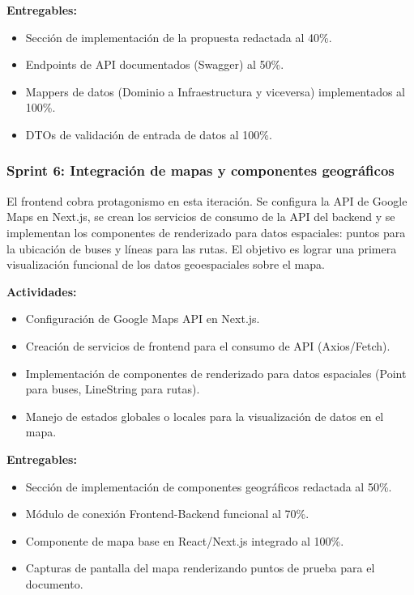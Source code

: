 \textbf{Entregables:}
\begin{itemize}
    \item Sección de implementación de la propuesta redactada al 40\%.
    \item Endpoints de API documentados (Swagger) al 50\%.
    \item Mappers de datos (Dominio a Infraestructura y viceversa) implementados al 100\%.
    \item DTOs de validación de entrada de datos al 100\%.
\end{itemize}

\subsubsection{Sprint 6: Integración de mapas y componentes geográficos}

El frontend cobra protagonismo en esta iteración. Se configura la API de Google Maps en Next.js, se crean los servicios de consumo de la API del backend y se implementan los componentes de renderizado para datos espaciales: puntos para la ubicación de buses y líneas para las rutas. El objetivo es lograr una primera visualización funcional de los datos geoespaciales sobre el mapa.

\textbf{Actividades:}
\begin{itemize}
    \item Configuración de Google Maps API en Next.js.
    \item Creación de servicios de frontend para el consumo de API (Axios/Fetch).
    \item Implementación de componentes de renderizado para datos espaciales (Point para buses, LineString para rutas).
    \item Manejo de estados globales o locales para la visualización de datos en el mapa.
\end{itemize}

\textbf{Entregables:}
\begin{itemize}
    \item Sección de implementación de componentes geográficos redactada al 50\%.
    \item Módulo de conexión Frontend-Backend funcional al 70\%.
    \item Componente de mapa base en React/Next.js integrado al 100\%.
    \item Capturas de pantalla del mapa renderizando puntos de prueba para el documento.
\end{itemize}


